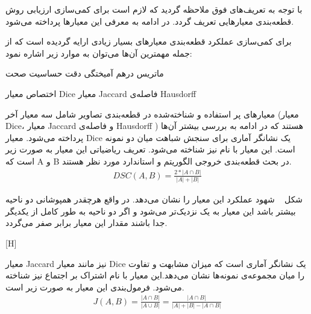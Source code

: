 
با توجه به تعریف‌های فوق ملاحظه گردید که لازم است برای کمی‌سازی ارزیابی روش قطعه‌بندی  معیارهایی تعریف گردد. در ادامه به معرفی این معیارها پرداخته می‌شود.

برای کمی‌سازی عملکرد قطعه‌بندی معیارهای بسیار زیادی ارایه گردیده است که از جمله مهمترین آن‌ها می‌توان به موارد زیر اشاره نمود:

\begin{multicols}{2}
	 ماتریس درهم آمیختگی
	 دقت
	 حساسیت
	 صحت
	
	  اختصاص
	 معیار Dice
	 معیار Jaccard
	 فاصله‌ی Hausdorff
	
\end{multicols}

معیارهای پر استفاده و شناخته‌شده در قطعه‌بندی تصاویر شامل سه معیار آخر (معیار Dice، معیار Jaccard و فاصله‌ی Hausdorff ) هستند که در ادامه به بررسی بیشتر آن‌ها پرداخته می‌شود.
معیار Dice یک نشانگر آماری برای سنجش شباهت میان دو نمونه است. این معیار با نام  نیز شناخته می‌شود. تعریف ریاضیاتی این معیار به صورت زیر است که A و B در بحث قطعه‌بندی خروجی الگوریتم و استاندارد مورد نظر هستند.
\begin{alignat}{5}
	DSC(A, B) = \frac{2*|A \cap B|}{|A|+|B|}    \label{dsc_def}
\end{alignat}

شکل ~ شهود عملکرد این معیار را نشان می‌دهد. در واقع هرچقدر همپوشانی دو ناحیه بیشتر باشد این معیار به یک نزدیک‌تر می‌شود و اگر دو ناحیه به طور کامل از یکدیگر جدا باشند مقدار این معیار برابر صفر می‌گردد.

[H]

معیار Jaccard نیز مانند معیار Dice یک نشانگر آماری است که میزان مشابهت و تفاوت را میان مجموعه‌ی نمونه‌ها نشان می‌دهد.این معیار با نام اشتراک بر اجتماع نیز شناخته می‌شود. فرمول‌بندی این معیار به صورت زیر است.
\begin{alignat}{5}
	J(A, B) = \frac{|A \cap B|}{|A \cup B|} = \frac{|A \cap B|}{|A| + |B| - |A \cap B|}   \label{jacc_def}
\end{alignat}

